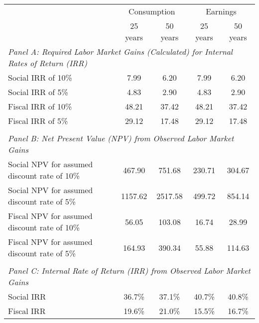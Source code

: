 \begin{table}[H]
\centering
\begin{tabular}{lcccc}
\toprule
&  \multicolumn{2}{c}{Consumption}
&  \multicolumn{2}{c}{Earnings}
\\ \cmidrule{2-3}
\cmidrule{4-5}
& 25 years        & 50 years                                            & 25 years      & 50 years
\\
\midrule
 \multicolumn{5}{l}{\textit{Panel A: Required Labor Market Gains (Calculated) for Internal Rates of Return (IRR)}} \\
Social IRR of 10\%
& 7.99
& 6.20
& 7.99
& 6.20 \\
Social IRR of 5\%
& 4.83
& 2.90
& 4.83
& 2.90 \\
Fiscal IRR of 10\%
& 48.21
& 37.42
& 48.21
& 37.42  \\
Fiscal IRR of 5\%
& 29.12
& 17.48
& 29.12
& 17.48      \\ \\
\multicolumn{5}{l}{\textit{Panel B: Net Present Value (NPV) from Observed Labor Market Gains}} \\
Social NPV for assumed discount rate of 10\%
& 467.90
& 751.68
& 230.71
& 304.67  \\
Social NPV for assumed discount rate of 5\%
& 1157.62
& 2517.58
& 499.72
& 854.14 \\
Fiscal NPV for assumed discount rate of 10\%
& 56.05
& 103.08
& 16.74
& 28.99  \\
Fiscal NPV for assumed discount rate of 5\%
& 164.93
& 390.34
& 55.88
& 114.63  \\ \\
\multicolumn{5}{l}{\textit{Panel C: Internal Rate of Return (IRR) from Observed Labor Market Gains}}  \\
Social IRR
& 36.7\%
& 37.1\%
& 40.7\%
& 40.8\%  \\
Fiscal IRR
& 19.6\%
& 21.0\%
& 15.5\%
& 16.7\%   \\
\bottomrule
\end{tabular}

\end{table}
